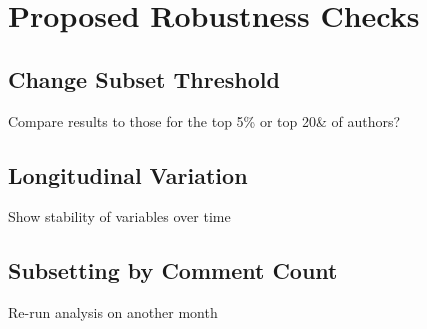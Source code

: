 \documentclass{article}
\begin{document}
\begin{landscape}

\end{landscape}





\section{Proposed Robustness Checks}

\subsection{Change Subset Threshold}

Compare results to those for the top 5\% or top 20\& of authors?

\subsection{Longitudinal Variation}

Show stability of variables over time

\subsection{Subsetting by Comment Count}

Re-run analysis on another month
\end{document}
